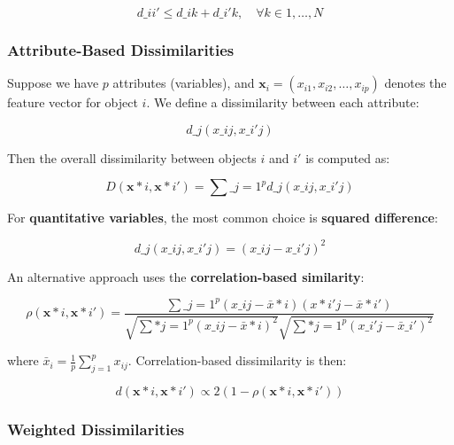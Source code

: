 \documentclass[
]{article}
\begin{document}
\begin{equation}
d\_{ii'} \leq d\_{ik} + d\_{i'k}, \quad \forall k \in {1, \dots, N}
\end{equation}

\hypertarget{attribute-based-dissimilarities}{%
\subsubsection{Attribute-Based
Dissimilarities}\label{attribute-based-dissimilarities}}

Suppose we have \(p\) attributes (variables), and
\(\mathbf{x}_i = (x_{i1}, x_{i2}, \dots, x_{ip})\) denotes the feature
vector for object \(i\). We define a dissimilarity between each
attribute:

\begin{equation}
d\_j(x\_{ij}, x\_{i'j})
\end{equation}

Then the overall dissimilarity between objects \(i\) and \(i'\) is
computed as:

\begin{equation}
D(\mathbf{x}*i, \mathbf{x}*{i'}) = \sum\_{j=1}^p d\_j(x\_{ij}, x\_{i'j})
\end{equation}

For \textbf{quantitative variables}, the most common choice is
\textbf{squared difference}:

\begin{equation}
d\_j(x\_{ij}, x\_{i'j}) = (x\_{ij} - x\_{i'j})^2
\end{equation}

An alternative approach uses the \textbf{correlation-based similarity}:

\begin{equation}
\rho(\mathbf{x}*i, \mathbf{x}*{i'}) = \frac{\sum\_{j=1}^p (x\_{ij} - \bar{x}*i)(x*{i'j} - \bar{x}*{i'})}{\sqrt{\sum*{j=1}^p (x\_{ij} - \bar{x}*i)^2} \sqrt{\sum*{j=1}^p (x\_{i'j} - \bar{x}\_{i'})^2}}
\end{equation}

where \(\bar{x}_i = \frac{1}{p} \sum_{j=1}^p x_{ij}\). Correlation-based
dissimilarity is then:

\begin{equation}
d(\mathbf{x}*i, \mathbf{x}*{i'}) \propto 2(1 - \rho(\mathbf{x}*i, \mathbf{x}*{i'}))
\end{equation}

\hypertarget{weighted-dissimilarities}{%
\subsubsection{Weighted
Dissimilarities}\label{weighted-dissimilarities}}
\end{document}

